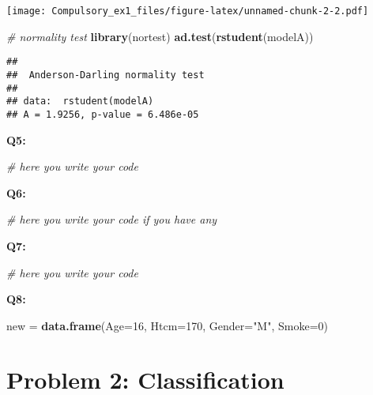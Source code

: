 \documentclass[]{article}
\newenvironment{Shaded}{\begin{snugshade}}{\end{snugshade}}
\newcommand{\KeywordTok}[1]{\textcolor[rgb]{0.13,0.29,0.53}{\textbf{#1}}}
\newcommand{\DataTypeTok}[1]{\textcolor[rgb]{0.13,0.29,0.53}{#1}}
\newcommand{\DecValTok}[1]{\textcolor[rgb]{0.00,0.00,0.81}{#1}}
\newcommand{\StringTok}[1]{\textcolor[rgb]{0.31,0.60,0.02}{#1}}
\newcommand{\CommentTok}[1]{\textcolor[rgb]{0.56,0.35,0.01}{\textit{#1}}}
\newcommand{\NormalTok}[1]{#1}
\begin{document}
\texttt{[image: Compulsory\_ex1\_files/figure-latex/unnamed-chunk-2-2.pdf]}

\begin{Shaded}
\begin{Highlighting}[]
\CommentTok{# normality test}
\KeywordTok{library}\NormalTok{(nortest) }
\KeywordTok{ad.test}\NormalTok{(}\KeywordTok{rstudent}\NormalTok{(modelA))}
\end{Highlighting}
\end{Shaded}

\begin{verbatim}
## 
##  Anderson-Darling normality test
## 
## data:  rstudent(modelA)
## A = 1.9256, p-value = 6.486e-05
\end{verbatim}

\textbf{Q5:}

\begin{Shaded}
\begin{Highlighting}[]
\CommentTok{# here you write your code}
\end{Highlighting}
\end{Shaded}

\textbf{Q6:}

\begin{Shaded}
\begin{Highlighting}[]
\CommentTok{# here you write your code if you have any}
\end{Highlighting}
\end{Shaded}

\textbf{Q7:}

\begin{Shaded}
\begin{Highlighting}[]
\CommentTok{# here you write your code}
\end{Highlighting}
\end{Shaded}

\textbf{Q8:}

\begin{Shaded}
\begin{Highlighting}[]
\NormalTok{new =}\StringTok{ }\KeywordTok{data.frame}\NormalTok{(}\DataTypeTok{Age=}\DecValTok{16}\NormalTok{, }\DataTypeTok{Htcm=}\DecValTok{170}\NormalTok{, }\DataTypeTok{Gender=}\StringTok{"M"}\NormalTok{, }\DataTypeTok{Smoke=}\DecValTok{0}\NormalTok{)}
\end{Highlighting}
\end{Shaded}

\section{Problem 2: Classification}\label{problem-2-classification}
\end{document}
